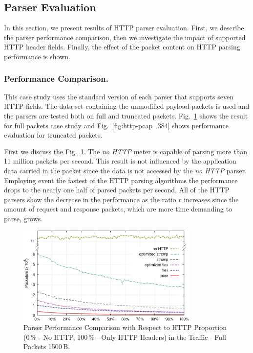 \subsection{Parser Evaluation} \label{subsec:http-perform_evaluation}

In this section, we present results of HTTP parser evaluation. First, we describe the parser performance comparison, then we investigate the impact of supported HTTP header fields. Finally, the effect of the packet content on HTTP parsing performance is shown.

\subsubsection*{Performance Comparison.}

This case study uses the standard version of each parser that supports seven HTTP fields. The data set containing the unmodified payload packets is used and the parsers are tested both on full and truncated packets. Fig.~\ref{fig:http-pcap_1500} shows the result for full packets case study and Fig.~\ref{fig:http-pcap_384} shows performance evaluation for truncated packets.

First we discuss the Fig.~\ref{fig:http-pcap_1500}. The \emph{no HTTP} meter is capable of parsing more than 11 million packets per second. This result is not influenced by the application data carried in the packet since the data is not accessed by the \emph{no HTTP} parser. Employing event the fastest of the HTTP parsing algorithms the performance drops to the nearly one half of parsed packets per second. All of the HTTP parsers show the decrease in the performance as the ratio $r$ increases since the amount of request and response packets, which are more time demanding to parse, grows.

\begin{figure}[tb]
        \centering
        \includegraphics[width=0.8\textwidth]{figures/paper-http/1500_pcap_norm_1}
        \caption{Parser Performance Comparison with Respect to HTTP Proportion (0\,\% - No HTTP, 100\,\% - Only HTTP Headers) in the Traffic - Full Packets 1500\,B.}
        \label{fig:http-pcap_1500}
\end{figure}

